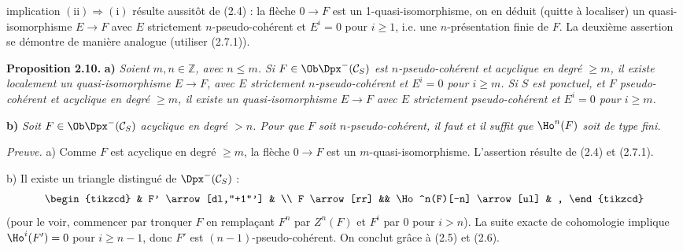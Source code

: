 implication \((\mathrm{ii})\Rightarrow(\mathrm{i})\) résulte aussitôt de (2.4) : la flèche \(0\to F\) est un 1-quasi-isomorphisme, on en déduit (quitte à localiser) un quasi-isomorphisme \(E\longrightarrow F\) avec \(E\) strictement \(n\)-pseudo-cohérent et \(E^i=0\) pour \(i\geq 1\), i.e. une \(n\)-présentation finie de \(F\). La deuxième assertion se démontre de manière analogue (utiliser (2.7.1)).

\textbf{Proposition 2.10.} \textbf{a)} \emph{Soient \(m,n\in\mathbb Z\), avec \(n\leq m\). Si \(F\in\Ob\Dpx^-(\mathcal C_S)\) est \(n\)-pseudo-cohérent et acyclique en degré \(\geq m\), il existe localement un quasi-isomorphisme \(E\longrightarrow F\), avec \(E\) strictement \(n\)-pseudo-cohérent et \(E^i=0\) pour \(i\geq m\). Si \(S\) est ponctuel, et \(F\) pseudo-cohérent et acyclique en degré \(\geq m\), il existe un quasi-isomorphisme \(E\longrightarrow F\) avec \(E\) strictement pseudo-cohérent et \(E^i=0\) pour \(i\geq m\).}

\textbf{b)} \emph{Soit \(F\in\Ob\Dpx^-(\mathcal C_S)\) acyclique en degré \(>n\). Pour que \(F\) soit \(n\)-pseudo-cohérent, il faut et il suffit que \(\Ho^n(F)\) soit de type fini.}

\emph{Preuve.} a) Comme \(F\) est acyclique en degré \(\geq m\), la flèche \(0\to F\) est un \(m\)-quasi-isomorphisme. L'assertion résulte de (2.4) et (2.7.1).

b) Il existe un triangle distingué de \(\Dpx^-(\mathcal C_S)\) :
\[
\begin{tikzcd}
& F' \arrow[dl,"+1"'] & \\
F \arrow[rr] && \Ho^n(F)[-n] \arrow[ul] & ,
\end{tikzcd}
\]
(pour le voir, commencer par tronquer \(F\) en remplaçant \(F^n\) par \(Z^n(F)\) et \(F^i\) par \(0\) pour \(i>n\)). La suite exacte de cohomologie implique \(\Ho^i(F')=0\) pour \(i\geq n-1\), donc \(F'\) est \((n-1)\)-pseudo-cohérent. On conclut grâce à (2.5) et (2.6).



\providecommand{\RHom}{\mathrm R\!\Hom}
\providecommand{\Ext}{\operatorname{Ext}}
\providecommand{\coh}{\operatorname{coh}}
\providecommand{\PreCoh}{\operatorname{precoh}}
\providecommand{\Tr}{\operatorname{Tr}}
\providecommand{\Qis}{\operatorname{Qis}}
\providecommand{\Rad}{\operatorname{rad}}
\providecommand{\Spec}{\operatorname{Spec}}
\providecommand{\End}{\operatorname{End}}
\providecommand{\Id}{\operatorname{Id}}
\providecommand{\varinjlim}{\mathop{\mathrm{lim}}\limits_{\longrightarrow}}
\providecommand{\varprojlim}{\mathop{\mathrm{lim}}\limits_{\longleftarrow}}
\providecommand{\qcoh}{\operatorname{qcoh}}
\providecommand{\amp}{\operatorname{amp}}



